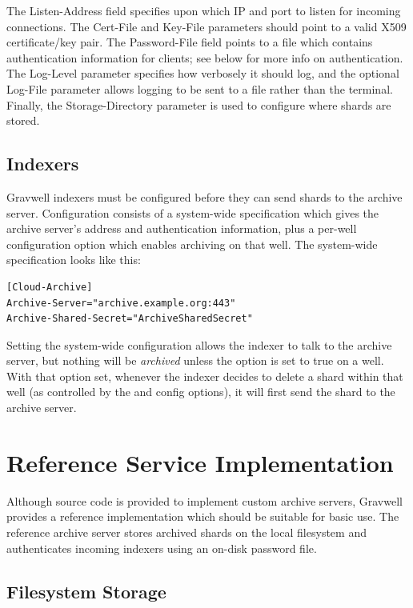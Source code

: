 The Listen-Address field specifies upon which IP and port to listen for
incoming connections. The Cert-File and Key-File parameters should point
to a valid X509 certificate/key pair. The Password-File field
points to a file which contains authentication information for clients;
see below for more info on authentication. The Log-Level parameter
specifies how verbosely it should log, and the optional Log-File
parameter allows logging to be sent to a file rather than the terminal.
Finally, the Storage-Directory parameter is used to configure where
shards are stored.

\subsection{Indexers}

Gravwell indexers must be configured before they can send shards to the
archive server. Configuration consists of a system-wide specification
which gives the archive server's address and authentication information,
plus a per-well configuration option which enables archiving on that
well. The system-wide specification looks like this:

\begin{Verbatim}[breaklines=true]
[Cloud-Archive]
Archive-Server="archive.example.org:443"
Archive-Shared-Secret="ArchiveSharedSecret"
\end{Verbatim}

Setting the system-wide configuration allows the indexer to talk to the
archive server, but nothing will be \emph{archived} unless the
 option is set to true on a well. With that
option set, whenever the indexer decides to delete a shard within that
well (as controlled by the  and
 config options), it will first send the shard to
the archive server.

\section{Reference Service Implementation}

Although source code is provided to implement custom archive servers,
Gravwell provides a reference implementation which should be suitable
for basic use. The reference archive server stores archived shards on
the local filesystem and authenticates incoming indexers using an
on-disk password file.

\subsection{Filesystem Storage}

